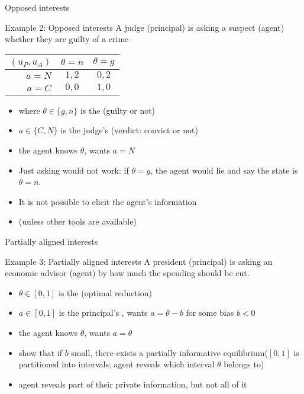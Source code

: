 \documentclass[english,10pt
,aspectratio=169
]{beamer}
\begin{document}
\begin{frame}{Opposed interests}
	\begin{exampleblock}{Example 2: Opposed interests}
		A judge (principal) is asking a suspect (agent) whether they are guilty of a crime
		\begin{center}
			\begin{tabular}{r | c | c |}
				$(u_P,u_A)$	& $\theta=n$	& $\theta=g$
				\\ \hline 
				$a=N$ 		& $1,2$			& $0,2$
				\\ \hline
				$a=C$		& $0,0$			& $1,0$
				\\ \hline 
			\end{tabular}
		\end{center}
	\end{exampleblock}
	
	\begin{itemize}
		\item where $\theta\in \{g,n\}$ is the  (guilty or not)
		\item $a \in \{C,N\}$ is the judge's  (verdict: convict or not)
		\item the agent knows $\theta$, wants $a=N$
		\pause \bigskip 
		\item Just asking would not work: if $\theta=g$, \alert<2>{the agent would lie} and say the state is $\theta=n$.
		\item It is \alert<2>{not possible} to elicit the agent's information
		\item (unless other tools are available)
	\end{itemize}
\end{frame}


\begin{frame}{Partially aligned interests}
	\begin{exampleblock}{Example 3: Partially aligned interests}
		A president (principal) is asking an economic advisor (agent) by how much the spending should be cut.
	\end{exampleblock}
	
	\begin{itemize}
		\item $\theta\in [0,1]$ is the  (optimal reduction)
		\item $a \in [0,1]$ is the principal's , wants $a=\theta-b$ for some bias $b<0$
		\item the agent knows $\theta$, wants $a=\theta$
		\pause \bigskip 
		\item \cite{crawford_strategic_1982} show that if $b$ small, there exists a \alert<2>{partially informative} equilibrium($[0,1]$ is partitioned into intervals; agent reveals which interval $\theta$ belongs to)
		\item agent \alert{reveals part} of their private information, but not all of it
	\end{itemize}
\end{frame}
\end{document}
